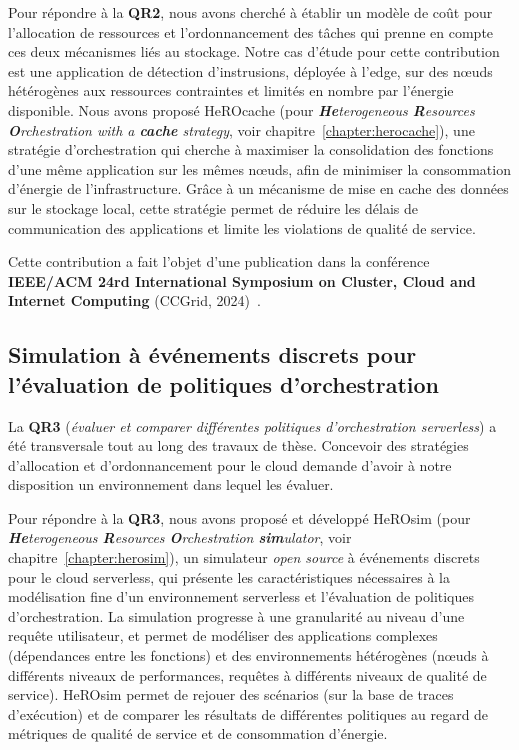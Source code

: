 Pour répondre à la \textbf{QR2}, nous avons cherché à établir un modèle de coût pour l'allocation de ressources et l'ordonnancement des tâches qui prenne en compte ces deux mécanismes liés au stockage. Notre cas d'étude pour cette contribution est une application de détection d'instrusions, déployée à l'edge, sur des nœuds hétérogènes aux ressources contraintes et limités en nombre par l'énergie disponible. Nous avons proposé HeROcache (pour \textit{\textbf{He}terogeneous \textbf{R}esources \textbf{O}rchestration with a \textbf{cache} strategy}, voir chapitre~\ref{chapter:herocache}), une stratégie d'orchestration qui cherche à maximiser la consolidation des fonctions d'une même application sur les mêmes nœuds, afin de minimiser la consommation d'énergie de l'infrastructure. Grâce à un mécanisme de mise en cache des données sur le stockage local, cette stratégie permet de réduire les délais de communication des applications et limite les violations de qualité de service.

Cette contribution a fait l'objet d'une publication dans la conférence \textbf{IEEE/ACM 24rd International Symposium on Cluster, Cloud and Internet Computing} (CCGrid, 2024)~\cite{herocache}.

\subsection{Simulation à événements discrets pour l'évaluation de politiques d'orchestration}


La \textbf{QR3} (\textit{évaluer et comparer différentes politiques d'orchestration serverless}) a été transversale tout au long des travaux de thèse. Concevoir des stratégies d'allocation et d'ordonnancement pour le cloud demande d'avoir à notre disposition un environnement dans lequel les évaluer.

Pour répondre à la \textbf{QR3}, nous avons proposé et développé HeROsim (pour \textit{\textbf{He}terogeneous \textbf{R}esources \textbf{O}rchestration \textbf{sim}ulator}, voir chapitre~\ref{chapter:herosim}), un simulateur \textit{open source} à événements discrets pour le cloud serverless, qui présente les caractéristiques nécessaires à la modélisation fine d'un environnement serverless et l'évaluation de politiques d'orchestration. La simulation progresse à une granularité au niveau d'une requête utilisateur, et permet de modéliser des applications complexes (dépendances entre les fonctions) et des environnements hétérogènes (nœuds à différents niveaux de performances, requêtes à différents niveaux de qualité de service). HeROsim permet de rejouer des scénarios (sur la base de traces d'exécution) et de comparer les résultats de différentes politiques au regard de métriques de qualité de service et de consommation d'énergie.

